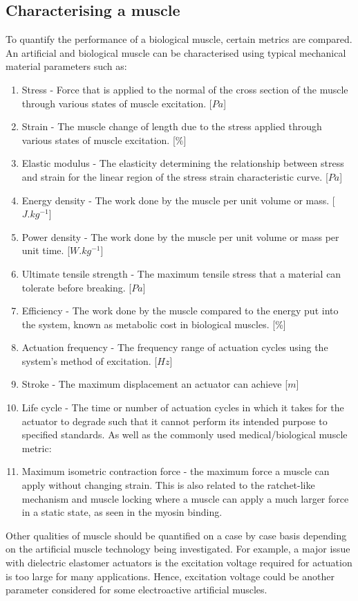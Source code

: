 \subsection{Characterising a muscle}
To quantify the performance of a biological muscle, certain metrics are compared. An artificial and biological muscle can be characterised using typical mechanical material parameters such as:
\begin{enumerate}
    \item Stress - Force that is applied to the normal of the cross section of the muscle through various states of muscle excitation. [$Pa$]
    \item Strain - The muscle change of length due to the stress applied through various states of muscle excitation. [\%]
    \item Elastic modulus - The elasticity determining the relationship between stress and strain for the linear region of the stress strain characteristic curve. [$Pa$]
    \item Energy density - The work done by the muscle per unit volume or mass. [$J.kg^{-1}$]
    \item Power density - The work done by the muscle per unit volume or mass per unit time. [$W.kg^{-1}$]
    \item Ultimate tensile strength - The maximum tensile stress that a material can tolerate before breaking. [$Pa$]
    \item Efficiency - The work done by the muscle compared to the energy put into the system, known as metabolic cost in biological muscles. [\%]
    \item Actuation frequency - The frequency range of actuation cycles using the system's method of excitation. [$Hz$]
    \item Stroke - The maximum displacement an actuator can achieve [$m$]
    \item Life cycle - The time or number of actuation cycles in which it takes for the actuator to degrade such that it cannot perform its intended purpose to specified standards.
\newline
\newline
    As well as the commonly used medical/biological muscle metric:
\newline
    \item Maximum isometric contraction force - the maximum force a muscle can apply without changing strain. This is also related to the ratchet-like mechanism and muscle locking where a muscle can apply a much larger force in a static state, as seen in the myosin binding\citep{Cross2006}.

\end{enumerate}
Other qualities of muscle should be quantified on a case by case basis depending on the artificial muscle technology being investigated. For example, a major issue with dielectric elastomer actuators is the excitation voltage required for actuation is too large for many applications. Hence, excitation voltage could be another parameter considered for some electroactive artificial muscles.

